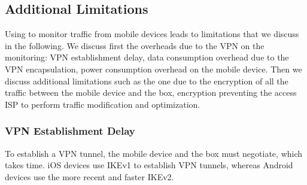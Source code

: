 



\subsection{Additional Limitations}
\label{sec:addit-limit}
Using \platname{} to monitor traffic from mobile devices leads to
limitations that we discuss in the following. We discuss first the
overheads due to the VPN on the monitoring: VPN establishment delay,
data consumption overhead due to the VPN encapsulation, power
consumption overhead on the mobile device. Then we discuss additional
limitations such as the one due to the encryption of all the traffic
between the mobile device and the \platname{} box, encryption
preventing the access ISP to perform traffic modification and
optimization. 

\subsubsection{VPN Establishment Delay}
To establish a VPN tunnel, the mobile device and the \platname{} box
must negotiate, which takes time. iOS devices use IKEv1 to establish VPN
tunnels, whereas Android devices use the more recent and faster IKEv2.


